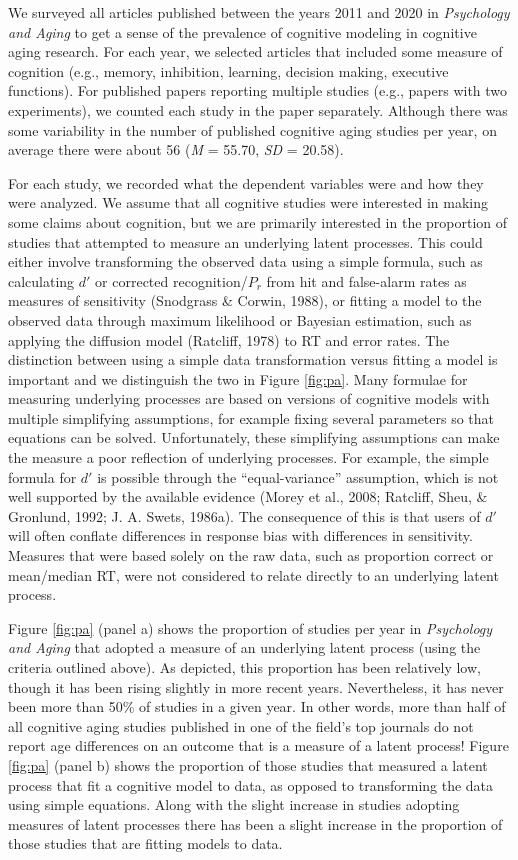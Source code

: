 \documentclass[
  english,
  ,man,floatsintext]{apa6}
\begin{document}
We surveyed all articles published between the years 2011 and 2020 in \emph{Psychology and Aging} to get a sense of the prevalence of cognitive modeling in cognitive aging research. For each year, we selected articles that included some measure of cognition (e.g., memory, inhibition, learning, decision making, executive functions). For published papers reporting multiple studies (e.g., papers with two experiments), we counted each study in the paper separately. Although there was some variability in the number of published cognitive aging studies per year, on average there were about 56 (\emph{M} = 55.70, \emph{SD} = 20.58).

For each study, we recorded what the dependent variables were and how they were analyzed. We assume that all cognitive studies were interested in making some claims about cognition, but we are primarily interested in the proportion of studies that attempted to measure an underlying latent processes. This could either involve transforming the observed data using a simple formula, such as calculating \(d'\) or corrected recognition/\(P_r\) from hit and false-alarm rates as measures of sensitivity (Snodgrass \& Corwin, 1988), or fitting a model to the observed data through maximum likelihood or Bayesian estimation, such as applying the diffusion model (Ratcliff, 1978) to RT and error rates. The distinction between using a simple data transformation versus fitting a model is important and we distinguish the two in Figure \ref{fig:pa}. Many formulae for measuring underlying processes are based on versions of cognitive models with multiple simplifying assumptions, for example fixing several parameters so that equations can be solved. Unfortunately, these simplifying assumptions can make the measure a poor reflection of underlying processes. For example, the simple formula for \(d'\) is possible through the \enquote{equal-variance} assumption, which is not well supported by the available evidence (Morey et al., 2008; Ratcliff, Sheu, \& Gronlund, 1992; J. A. Swets, 1986a). The consequence of this is that users of \(d'\) will often conflate differences in response bias with differences in sensitivity. Measures that were based solely on the raw data, such as proportion correct or mean/median RT, were not considered to relate directly to an underlying latent process.

Figure \ref{fig:pa} (panel a) shows the proportion of studies per year in \emph{Psychology and Aging} that adopted a measure of an underlying latent process (using the criteria outlined above). As depicted, this proportion has been relatively low, though it has been rising slightly in more recent years. Nevertheless, it has never been more than 50\% of studies in a given year. In other words, more than half of all cognitive aging studies published in one of the field's top journals do not report age differences on an outcome that is a measure of a latent process! Figure \ref{fig:pa} (panel b) shows the proportion of those studies that measured a latent process that fit a cognitive model to data, as opposed to transforming the data using simple equations. Along with the slight increase in studies adopting measures of latent processes there has been a slight increase in the proportion of those studies that are fitting models to data.
\end{document}
